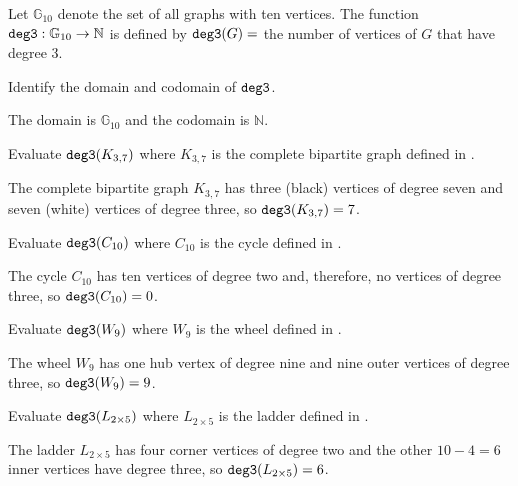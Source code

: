 \begin{exam}
\label{exam_count_vert_deg3}
    Let $\mathbb{G}_{10}$ denote the set of all graphs with ten vertices. The function $\texttt{deg3}: \mathbb{G}_{10} \to \mathbb{N}$ is defined by $\texttt{deg3}(G) =$ the number of vertices of $G$ that have degree 3. 
        \begin{apart}
            \item Identify the domain and codomain of $\texttt{deg3}$.
                \begin{soln}
                    The domain is $\mathbb{G}_{10}$ and the codomain is $\mathbb{N}$. 
                \end{soln}
            \item Evaluate $\texttt{deg3}(K_{3,7})$ where $K_{3,7}$ is the complete bipartite graph defined in .
                \begin{soln}
                     The complete bipartite graph $K_{3,7}$ has three (black) vertices of degree seven and seven (white) vertices of degree three, so $\texttt{deg3}(K_{3,7})=7$.
                \end{soln}
            \item Evaluate $\texttt{deg3}(C_{10})$ where $C_{10}$ is the cycle defined in .
                \begin{soln}
                     The cycle $C_{10}$ has ten vertices of degree two and, therefore, no vertices of degree three, so $\texttt{deg3}(C_{10})=0$.
                \end{soln}
            \item Evaluate $\texttt{deg3}(W_9)$ where $W_9$ is the wheel defined in .
                \begin{soln}
                     The wheel $W_9$ has one hub vertex of degree nine and nine outer vertices of degree three, so $\texttt{deg3}(W_9)=9$.
                \end{soln}
            \item Evaluate $\texttt{deg3}(L_{2 \times 5})$ where $L_{2 \times 5}$ is the ladder defined in .
                \begin{soln}                
                     The ladder $L_{2 \times 5}$ has four corner vertices of degree two and the other $10-4=6$ inner vertices have degree three, so $\texttt{deg3}(L_{2 \times 5})=6$.  
                \end{soln}


\end{apart}
\end{exam}

